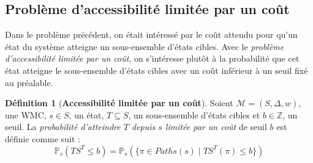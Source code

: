 \documentclass[12pt,a4paper]{report}
\theoremstyle{definition}%
\newtheorem{definition}{Définition}[chapter]
\theoremstyle{remark}
\newcommand{\pr}{\mathbb{P}}
\begin{document}
\subsection{Problème d'accessibilité limitée par un coût}
Dans le problème précédent, on était intéressé par le coût attendu pour qu'un état du système atteigne un sous-ensemble d'états cibles. Avec le \textit{problème d'accessibilité limitée par un coût}, on s'intéresse plutôt à la probabilité que cet état atteigne le sous-ensemble d'états cibles avec un coût inférieur à un seuil fixé au préalable.

\begin{definition}[\textbf{Accessibilité limitée par un coût}]
	Soient $\mathcal{M} = (S, \Delta, w)$, une WMC, $s \in S$, un état, $T \subseteq S$, un sous-ensemble d'états cibles et $b \in \mathbb{Z}$, un seuil. La \textit{probabilité d'atteindre $T$ depuis $s$ limitée par un coût} de seuil $b$ est définie comme suit : 
	\[\pr_s(TS^T \leq b) = \pr_s(\{\pi \in Paths(s) \; | \; TS^T(\pi) \leq b \}) \]
\end{definition}
\end{document}
